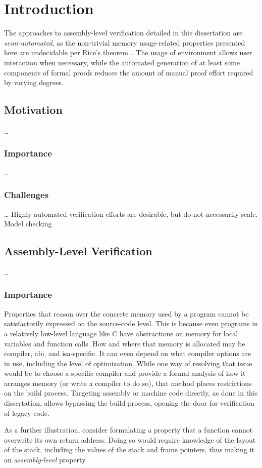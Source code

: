 \chapter{Introduction}

The approaches to assembly-level verification detailed in this dissertation%
are \emph{semi-automated},
as the non-trivial memory usage-related properties presented here are undecidable
per Rice's theorem~\citep{rice1953classes}.
The usage of  environment allows user interaction when necessary,
while the automated generation
of at least some components of formal proofs
reduces the amount of manual proof effort required by varying degrees.

\section{Motivation}
\todo\dots
\subsection{Importance}
\todo\dots
{}

\subsection{Challenges}
\todo\dots
Highly-automated verification efforts are desirable, but do not necessarily scale.
Model checking

\section{Assembly-Level Verification}
\todo\dots

\subsection{Importance}
Properties that reason over the concrete memory used by a program
cannot be satisfactorily expressed on the source-code level.
This is because even programs in a relatively low-level language like C
have abstractions on memory for local variables and function calls.
How and where that memory is allocated may be compiler, \ac{abi}, and \ac{isa}-specific.
It can even depend on what compiler options are in use,
including the level of optimization.
While one way of resolving that issue would be to choose a specific compiler
and provide a formal analysis of how it arranges memory (or write a compiler to do so),
that method places restrictions on the build process.
Targeting assembly or machine code directly, as done in this dissertation,
allows bypassing the build process, opening the door for verification of legacy code.
\begin{example}\label{ex:rop}
  As a further illustration, consider formulating a property
  that a function cannot overwrite its own return address.
  Doing so would require knowledge of the layout of the stack,
  including the values of the stack and frame pointers,
  thus making it an \emph{assembly-level} property.
\end{example}

